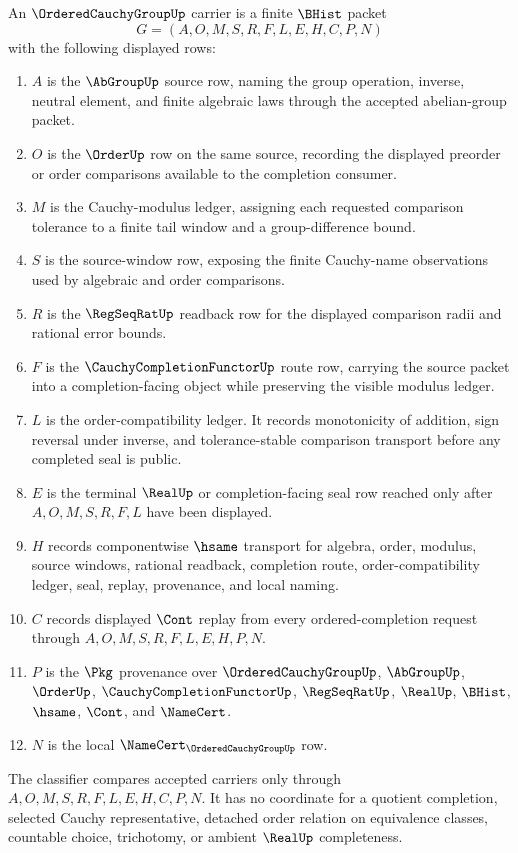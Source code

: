 \begin{definition}
\label{def:ordered-cauchy-group-carrier}
An $\OrderedCauchyGroupUp$ carrier is a finite $\BHist$ packet
$$
G=(A,O,M,S,R,F,L,E,H,C,P,N)
$$
with the following displayed rows:
\begin{enumerate}
\item $A$ is the $\AbGroupUp$ source row, naming the group operation, inverse, neutral element, and finite algebraic laws through the accepted abelian-group packet.
\item $O$ is the $\OrderUp$ row on the same source, recording the displayed preorder or order comparisons available to the completion consumer.
\item $M$ is the Cauchy-modulus ledger, assigning each requested comparison tolerance to a finite tail window and a group-difference bound.
\item $S$ is the source-window row, exposing the finite Cauchy-name observations used by algebraic and order comparisons.
\item $R$ is the $\RegSeqRatUp$ readback row for the displayed comparison radii and rational error bounds.
\item $F$ is the $\CauchyCompletionFunctorUp$ route row, carrying the source packet into a completion-facing object while preserving the visible modulus ledger.
\item $L$ is the order-compatibility ledger. It records monotonicity of addition, sign reversal under inverse, and tolerance-stable comparison transport before any completed seal is public.
\item $E$ is the terminal $\RealUp$ or completion-facing seal row reached only after $A,O,M,S,R,F,L$ have been displayed.
\item $H$ records componentwise $\hsame$ transport for algebra, order, modulus, source windows, rational readback, completion route, order-compatibility ledger, seal, replay, provenance, and local naming.
\item $C$ records displayed $\Cont$ replay from every ordered-completion request through $A,O,M,S,R,F,L,E,H,P,N$.
\item $P$ is the $\Pkg$ provenance over $\OrderedCauchyGroupUp$, $\AbGroupUp$, $\OrderUp$, $\CauchyCompletionFunctorUp$, $\RegSeqRatUp$, $\RealUp$, $\BHist$, $\hsame$, $\Cont$, and $\NameCert$.
\item $N$ is the local $\NameCert_{\OrderedCauchyGroupUp}$ row.
\end{enumerate}
The classifier compares accepted carriers only through $A,O,M,S,R,F,L,E,H,C,P,N$. It has no coordinate for a quotient completion, selected Cauchy representative, detached order relation on equivalence classes, countable choice, trichotomy, or ambient $\RealUp$ completeness.
\end{definition}

